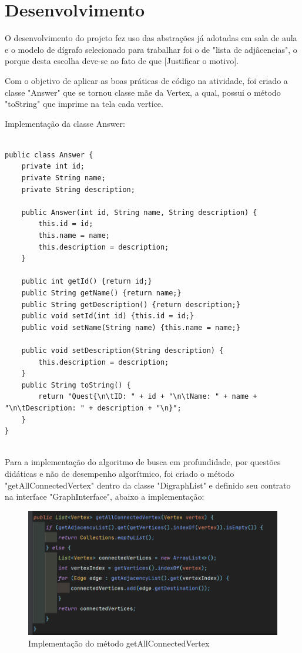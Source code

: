 \documentclass[a4paper, 12pt]{article}
\begin{document}
\section{Desenvolvimento}

O desenvolvimento do projeto fez uso das abstrações já adotadas em sala de aula e o modelo de dígrafo selecionado para trabalhar foi o de "lista de adjâcencias", o porque desta escolha deve-se ao fato de que [Justificar o motivo].

Com o objetivo de aplicar as boas práticas de código na atividade, foi criado a classe "Answer" que se tornou classe mãe da Vertex, a qual, possui o método "toString" que imprime na tela cada vertice.

Implementação da classe Answer:

\begin{verbatim}

public class Answer {
    private int id;
    private String name;
    private String description;
    
    public Answer(int id, String name, String description) {
        this.id = id;
        this.name = name;
        this.description = description;
    }
    
    public int getId() {return id;}
    public String getName() {return name;}
    public String getDescription() {return description;}
    public void setId(int id) {this.id = id;}
    public void setName(String name) {this.name = name;}
    
    public void setDescription(String description) {
        this.description = description;
    }
    public String toString() {
        return "Quest{\n\tID: " + id + "\n\tName: " + name + "\n\tDescription: " + description + "\n}";
    }
}


\end{verbatim}


Para a implementação do algoritmo de busca em profundidade, por questões didáticas e não de desempenho algorítmico, foi criado o método "getAllConnectedVertex" dentro da classe "DigraphList" e definido seu contrato na interface "GraphInterface", abaixo a implementação:
\begin{figure}[h!]
\center 
\includegraphics[width=.8\textwidth]{getAllConnectedVertexMethod.png}
\caption{Implementação do método getAllConnectedVertex}
\end{figure}
\end{document}
